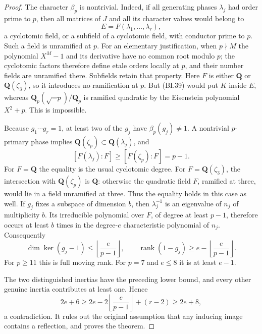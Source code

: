 \begin{proof}
The character $\beta_p$ is nontrivial.  Indeed, if all generating
phases $\lambda_j$ had order prime to $p$, then all matrices of
$J$ and all its character values would belong to
\[
                    E=F(\lambda_1,\ldots,\lambda_r),
\]
a cyclotomic field, or a subfield of a cyclotomic field, with
conductor prime to $p$.  Such a field is unramified at $p$.
For an elementary justification, when $p\nmid M$ the polynomial
$X^M-1$ and its derivative have no common root modulo $p$;
the cyclotomic factors therefore define etale orders locally at
$p$, and their number fields are unramified there.  Subfields
retain that property.  Here $F$ is either $\mathbf Q$ or
$\mathbf Q(\zeta_3)$, so it introduces no ramification at $p$.
But (BI.39) would put $K$ inside $E$, whereas
$\mathbf Q_p(\sqrt{-p})/\mathbf Q_p$ is ramified quadratic by
the Eisenstein polynomial $X^2+p$.  This is impossible.

Because $g_1\cdots g_r=1$, at least two of the $g_j$ have
$\beta_p(g_j)\ne1$.  A nontrivial $p$-primary phase implies
$\mathbf Q(\zeta_p)\subset\mathbf Q(\lambda_j)$, and
\[
 [F(\lambda_j):F]\ge[F(\zeta_p):F]=p-1.
                                                               \tag{BI.44}
\]
For $F=\mathbf Q$ the equality is the usual cyclotomic degree.
For $F=\mathbf Q(\zeta_3)$, the intersection with
$\mathbf Q(\zeta_p)$ is $\mathbf Q$: otherwise the quadratic
field $F$, ramified at three, would lie in a field unramified
at three.  Thus the equality holds in this case as well.
If $g_j$ fixes a subspace of dimension $b$, then
$\lambda_j^{-1}$ is an eigenvalue of $n_j$ of multiplicity $b$.
Its irreducible polynomial over $F$, of degree at least $p-1$,
therefore occurs at least $b$ times in the degree-$e$
characteristic polynomial of $n_j$.  Consequently
\[
 \dim\ker(g_j-1)\le\left\lfloor\frac{e}{p-1}\right\rfloor,
 \qquad
 \operatorname{rank}(1-g_j)\ge
              e-\left\lfloor\frac{e}{p-1}\right\rfloor.
\]
For $p\ge11$ this is full moving rank.  For $p=7$ and $e\le8$
it is at least $e-1$.

The two distinguished inertias have the preceding lower bound,
and every other genuine inertia contributes at least one.  Hence
\[
 2e+6\ge2e-2\left\lfloor\frac{e}{p-1}\right\rfloor+(r-2)
                   \ge2e+8,
\]
a contradiction.  It rules out the original assumption that any
inducing image contains a reflection, and proves the theorem.
\end{proof}

